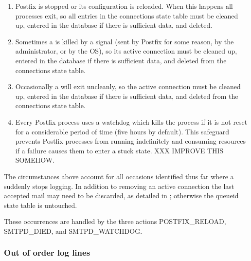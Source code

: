 \begin{enumerate}

    \item Postfix is stopped or its configuration is reloaded.  When this
        happens all  processes exit, so all entries in the
        connections state table must be cleaned up, entered in the database
        if there is sufficient data, and deleted.

    \item Sometimes a  is killed by a signal (sent by Postfix
        for some reason, by the administrator, or by the OS), so its active
        connection must be cleaned up, entered in the database if there is
        sufficient data, and deleted from the connections state table.

    \item Occasionally a  will exit uncleanly, so the active
        connection must be cleaned up, entered in the database if there is
        sufficient data, and deleted from the connections state table.

    \item Every Postfix process uses a watchdog which kills the process if
        it is not reset for a considerable period of time (five hours by
        default).  This safeguard prevents Postfix processes from running
        indefinitely and consuming resources if a failure causes them to
        enter a stuck state.  XXX IMPROVE THIS SOMEHOW\@.

\end{enumerate}

The circumstances above account for all occasions identified thus far where
a  suddenly stops logging.  In addition to removing an active
connection the last accepted mail may need to be discarded, as detailed in
; otherwise the queueid state table
is untouched.

These occurrences are handled by the three actions POSTFIX\_RELOAD,
SMTPD\_DIED, and SMTPD\_WATCHDOG\@.

\subsubsection{Out of order log lines}

\label{out of order log lines}

